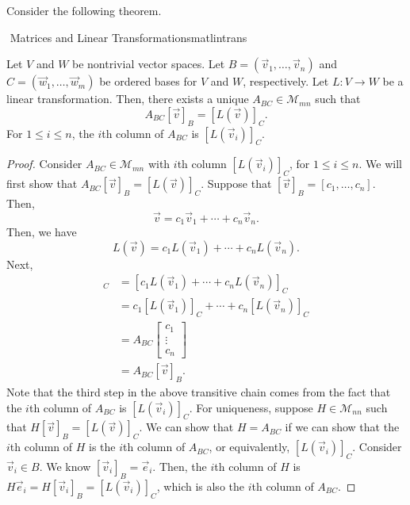         Consider the following theorem. 
        \begin{theorem}{\Stop\,\,Matrices and Linear Transformations}{matlintrans}
            
            Let \(V\) and \(W\) be nontrivial vector spaces. Let \(B=(\vec{v}_1,\ldots,\vec{v}_n)\) and \(C=(\vec{w}_1,\ldots,\vec{w}_m)\) be ordered bases for \(V\) and \(W\), respectively. Let \(L:V\to W\) be a linear transformation. Then, there exists a unique \(A_{BC}\in\mathcal{M}_{mn}\) such that
            \begin{equation*}
                A_{BC}[\vec{v}]_{B}=[L(\vec{v})]_{C}.
            \end{equation*}
            For \(1\leq i\leq n\), the \(i\)th column of \(A_{BC}\) is \([L(\vec{v}_i)]_C\).
            \begin{proof}
                Consider \(A_{BC}\in\mathcal{M}_{mn}\) with \(i\)th column \([L(\vec{v}_i)]_C\), for \(1\leq i\leq n\). We will first show that \(A_{BC}[\vec{v}]_B=[L(\vec{v})]_C\). Suppose that \([\vec{v}]_B=[c_1,\ldots,c_n]\). Then,
                \begin{equation*}
                    \vec{v}=c_1\vec{v}_1+\cdots+c_n\vec{v}_n.
                \end{equation*}
                Then, we have
                \begin{equation*}
                    L(\vec{v})=c_1L(\vec{v}_1)+\cdots+c_nL(\vec{v}_n).
                \end{equation*}
                Next,
                \begin{align*}
                    [L(\vec{v})]_C&=[c_1L(\vec{v}_1)+\cdots+c_nL(\vec{v}_n)]_C \\
                    &=c_1[L(\vec{v}_1)]_C+\cdots+c_n[L(\vec{v}_n)]_C \\
                    &=A_{BC}\begin{bmatrix} c_1 \\ \vdots \\ c_n \end{bmatrix} \\
                    &=A_{BC}[\vec{v}]_B.
                \end{align*}
                Note that the third step in the above transitive chain comes from the fact that the \(i\)th column of \(A_{BC}\) is \([L(\vec{v}_i)]_C\). For uniqueness, suppose \(H\in\mathcal{M}_{nn}\) such that \(H[\vec{v}]_B=[L(\vec{v})]_C\). We can show that \(H=A_{BC}\) if we can show that the \(i\)th column of \(H\) is the \(i\)th column of \(A_{BC}\), or equivalently, \([L(\vec{v}_i)]_C\). Consider \(\vec{v}_i\in B\). We know \([\vec{v}_i]_B=\vec{e}_i\). Then, the \(i\)th column of \(H\) is \(H\vec{e}_i=H[\vec{v}_i]_B=[L(\vec{v}_i)]_C\), which is also the \(i\)th column of \(A_{BC}\).
            \end{proof}
            
        \end{theorem}

